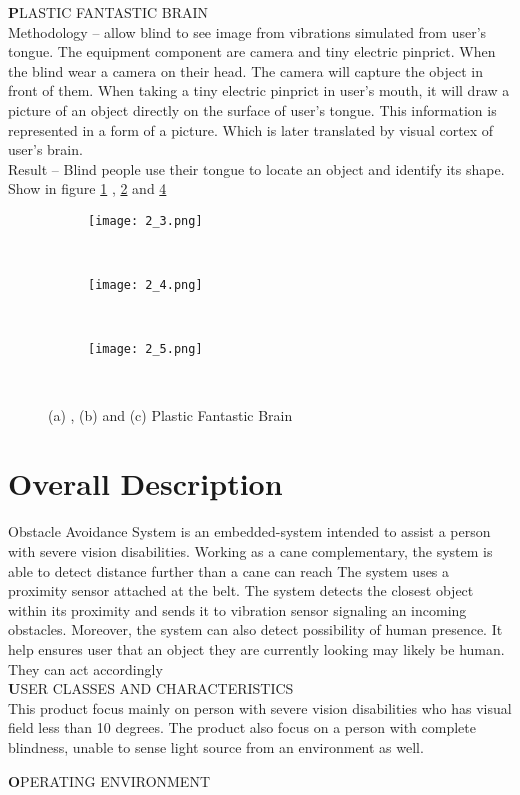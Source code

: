 \textbf PLASTIC FANTASTIC BRAIN\\
Methodology – allow blind to see image from vibrations simulated from user’s tongue. The equipment component are camera and tiny electric pinprict. When the blind wear a camera on their head. The camera will capture the object in front of them. When taking a tiny electric pinprict in user’s mouth, it will draw a picture of an object directly on the surface of user’s tongue. This information is represented in a form of a picture. Which is later translated by visual cortex of user’s brain.\\
Result – Blind people use their tongue to locate an object and identify its shape. Show in figure 
\ref{fig:2_3} , \ref{fig:2_4} and \ref{fig:2_5}

\begin{figure}[t]
	\centering
	\begin{subfigure}[b]{0.4\textwidth}
		\texttt{[image: 2\_3.png]}
		\caption{}
		\label{fig:2_3}
	\end{subfigure}\\
	\begin{subfigure}[b]{0.39\textwidth}
		\texttt{[image: 2\_4.png]}
		\caption{}
		\label{fig:2_4}
	\end{subfigure}\\
	\begin{subfigure}[b]{0.39\textwidth}
		\texttt{[image: 2\_5.png]}
		\caption{}
		\label{fig:2_5}
	\end{subfigure}\\
	\caption{(a) , (b) and (c) Plastic Fantastic Brain}
\end{figure}


\section{Overall Description}
Obstacle Avoidance System is an embedded-system intended to assist a person with severe vision disabilities. Working as a cane complementary, the system is able to detect distance further than a cane can reach
The system uses a proximity sensor attached at the belt. The system detects the closest object within its proximity and sends it to vibration sensor signaling an incoming obstacles. Moreover, the system can also detect possibility of human presence. It help ensures user that an object they are currently looking may likely be human. They can act accordingly\\

\textbf USER CLASSES AND CHARACTERISTICS\\
This product focus mainly on person with severe vision disabilities who has visual field less than 10 degrees. The product also focus on a person with complete blindness, unable to sense light source from an environment as well.

\textbf OPERATING ENVIRONMENT\\

